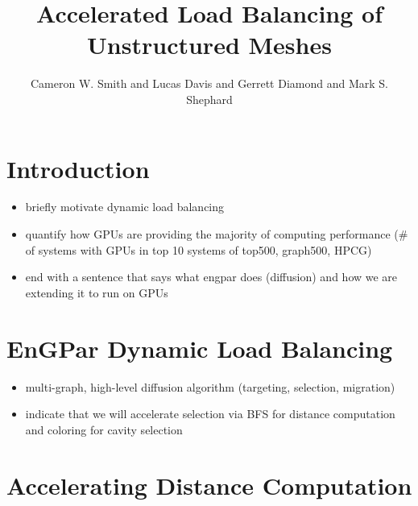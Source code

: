 \documentclass[graybox]{svmult}
\begin{document}
\title*{Accelerated Load Balancing of Unstructured Meshes}
\author{
Cameron W. Smith
and Lucas Davis
and Gerrett Diamond
and Mark S. Shephard
}

\maketitle


\section{Introduction} \label{sec:intro}

\begin{itemize}
  \item briefly motivate dynamic load balancing
  \item quantify how GPUs are providing the majority of computing performance (\# of systems with GPUs in top 10 systems of top500, graph500, HPCG)
  \item end with a sentence that says what engpar does (diffusion) and how we are
extending it to run on GPUs
\end{itemize}

\section{EnGPar Dynamic Load Balancing} \label{sec:engpar}

\begin{itemize}
  \item multi-graph, high-level diffusion algorithm (targeting, selection, migration)
  \item indicate that we will accelerate selection via BFS for distance computation and coloring for cavity selection
\end{itemize}

\section{Accelerating Distance Computation} \label{sec:dist}
\end{document}
